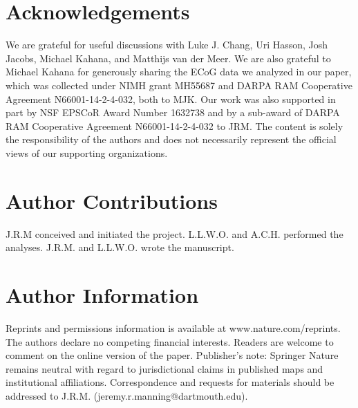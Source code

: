 \documentclass[11pt]{article}
\begin{document}
\section*{Acknowledgements}
We are grateful for useful discussions with Luke J. Chang, Uri Hasson,
Josh Jacobs, Michael Kahana, and Matthijs van der Meer.  We are also
grateful to Michael Kahana for generously sharing the ECoG data we
analyzed in our paper, which was collected under NIMH grant MH55687
and DARPA RAM Cooperative Agreement N66001-14-2-4-032, both to MJK.
Our work was also supported in part by NSF EPSCoR Award Number 1632738
and by a sub-award of DARPA RAM Cooperative Agreement
N66001-14-2-4-032 to JRM.  The content is solely the responsibility of
the authors and does not necessarily represent the official views of
our supporting organizations.

\section*{Author Contributions}
J.R.M conceived and initiated the project. L.L.W.O. and A.C.H. performed the analyses. J.R.M. and L.L.W.O. wrote the manuscript.

\section*{Author Information}
Reprints and permissions information is available at www.nature.com/reprints.  The authors declare no competing financial interests.  Readers are welcome to comment on the online version of the paper.  Publisher's note: Springer Nature remains neutral with regard to jurisdictional claims in published maps and institutional affiliations.  Correspondence and requests for materials should be addressed to J.R.M. (jeremy.r.manning@dartmouth.edu).




\clearpage
\end{document}
